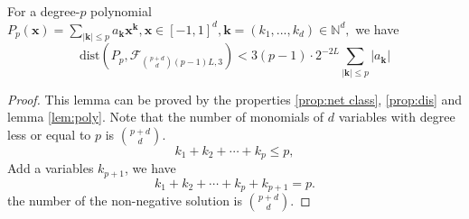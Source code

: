 \begin{lemma}
For a degree-$p$ polynomial $P_p(\bm{x}) = \sum_{|\bm{k}|\le p}a_{\bm k}\bm x^{\bm k},\bm x\in [-1,1]^d,\bm k = (k_1,...,k_d)\in\mathbb{N}^d,$ we have 
\[
\mbox{dist}\left(P_p,\mathcal F_{\binom{p+d}{d}(p-1)L,3}\right)<3(p-1)\cdot 2^{-2L}\sum_{|\bm k|\le p}|a_{\bm k}|
\]
\end{lemma}\label{lem:poly}

\begin{proof}
This lemma can be proved by the properties \ref{prop:net class}, \ref{prop:dis} and lemma \ref{lem:poly}.
Note that the number of monomials of $d$ variables with degree less or equal to $p$ is $\binom{p+d}{d}$.
$$
k_1 + k_2 + \cdots + k_p \le p,
$$
Add a variables $k_{p+1}$, we have
$$
k_1 + k_2 + \cdots + k_p + k_{p+1} = p.
$$
the number of the non-negative solution is $\binom{p+d}{d}$.
\end{proof}

